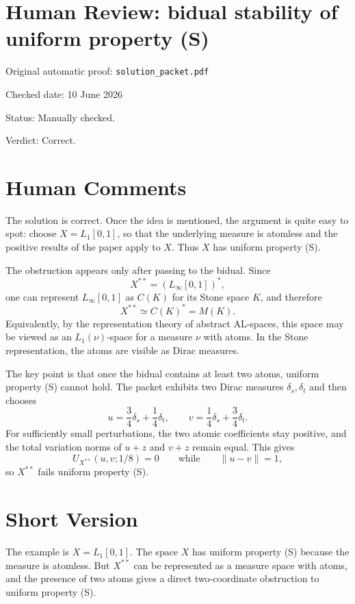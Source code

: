 \documentclass[11pt]{article}
\begin{document}
\section*{Human Review: bidual stability of uniform property (S)}

\noindent Original automatic proof: \texttt{solution\_packet.pdf}

\noindent Checked date: 10 June 2026

\noindent Status: Manually checked.

\noindent Verdict: Correct.

\section*{Human Comments}

The solution is correct. Once the idea is mentioned, the argument is quite
easy to spot: choose \(X=L_1[0,1]\), so that the underlying measure is
atomless and the positive results of the paper apply to \(X\). Thus \(X\) has
uniform property (S).

The obstruction appears only after passing to the bidual. Since
\[
  X^{**}=(L_\infty[0,1])^*,
\]
one can represent \(L_\infty[0,1]\) as \(C(K)\) for its Stone space \(K\), and
therefore
\[
  X^{**}\simeq C(K)^*=M(K).
\]
Equivalently, by the representation theory of abstract AL-spaces, this space
may be viewed as an \(L_1(\nu)\)-space for a measure \(\nu\) with atoms. In
the Stone representation, the atoms are visible as Dirac measures.

The key point is that once the bidual contains at least two atoms, uniform
property (S) cannot hold. The packet exhibits two Dirac measures
\(\delta_s,\delta_t\) and then chooses
\[
  u=\frac34\delta_s+\frac14\delta_t,\qquad
  v=\frac14\delta_s+\frac34\delta_t.
\]
For sufficiently small perturbations, the two atomic coefficients stay
positive, and the total variation norms of \(u+z\) and \(v+z\) remain equal.
This gives
\[
  U_{X^{**}}(u,v;1/8)=0
  \qquad\text{while}\qquad
  \|u-v\|=1,
\]
so \(X^{**}\) fails uniform property (S).

\section*{Short Version}

The example is \(X=L_1[0,1]\). The space \(X\) has uniform property (S)
because the measure is atomless. But \(X^{**}\) can be represented as a
measure space with atoms, and the presence of two atoms gives a direct
two-coordinate obstruction to uniform property (S).
\end{document}
